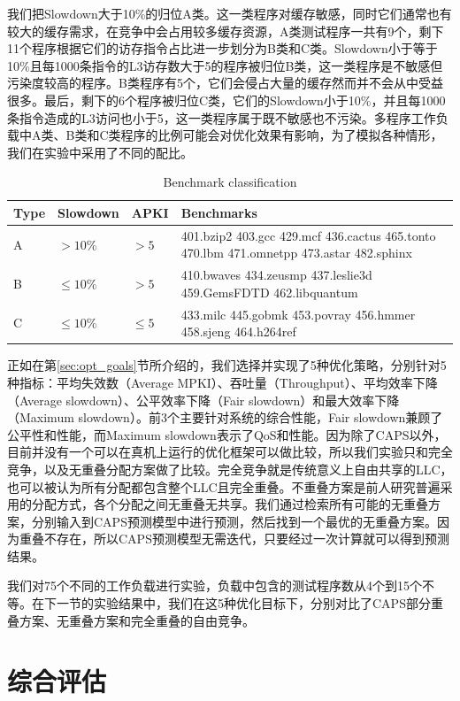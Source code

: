 我们把Slowdown大于10\%的归位A类。这一类程序对缓存敏感，同时它们通常也有较大的缓存需求，在竞争中会占用较多缓存资源，A类测试程序一共有9个，剩下11个程序根据它们的访存指令占比进一步划分为B类和C类。Slowdown小于等于10\%且每1000条指令的L3访存数大于5的程序被归位B类，这一类程序是不敏感但污染度较高的程序。B类程序有5个，它们会侵占大量的缓存然而并不会从中受益很多。最后，剩下的6个程序被归位C类，它们的Slowdown小于10\%，并且每1000条指令造成的L3访问也小于5，这一类程序属于既不敏感也不污染。多程序工作负载中A类、B类和C类程序的比例可能会对优化效果有影响，为了模拟各种情形，我们在实验中采用了不同的配比。

\begin{table}[htbp]
\caption{Benchmark classification}
\label{tab:benchmarks}
\centering
\begin{tabularx} {1\textwidth}{|l|l|l|X| } 
 \hline
 Type & Slowdown & APKI & Benchmarks \\
 \hline
 A & $> 10\%$ & $> 5$ & 401.bzip2 403.gcc 429.mcf 436.cactus 465.tonto 470.lbm 471.omnetpp 473.astar 482.sphinx\\ 
 \hline
 B & $\leq 10\%$ & $> 5$ & 410.bwaves 434.zeusmp 437.leslie3d 459.GemsFDTD 462.libquantum\\ 
 \hline
 C & $\leq 10\%$ & $\leq 5$ & 433.milc 445.gobmk 453.povray 456.hmmer 458.sjeng 464.h264ref\\
 \hline 
\end{tabularx}
\end{table}

正如在第\ref{sec:opt_goals}节所介绍的，我们选择并实现了5种优化策略，分别针对5种指标：平均失效数（Average MPKI）、吞吐量（Throughput）、平均效率下降（Average slowdown）、公平效率下降（Fair slowdown）和最大效率下降（Maximum slowdown）。前3个主要针对系统的综合性能，Fair slowdown兼顾了公平性和性能，而Maximum slowdown表示了QoS和性能。因为除了CAPS以外，目前并没有一个可以在真机上运行的优化框架可以做比较，所以我们实验只和完全竞争，以及无重叠分配方案做了比较。完全竞争就是传统意义上自由共享的LLC，也可以被认为所有分配都包含整个LLC且完全重叠。不重叠方案是前人研究普遍采用的分配方式，各个分配之间无重叠无共享。我们通过检索所有可能的无重叠方案，分别输入到CAPS预测模型中进行预测，然后找到一个最优的无重叠方案。因为重叠不存在，所以CAPS预测模型无需迭代，只要经过一次计算就可以得到预测结果。

我们对75个不同的工作负载进行实验，负载中包含的测试程序数从4个到15个不等。在下一节的实验结果中，我们在这5种优化目标下，分别对比了CAPS部分重叠方案、无重叠方案和完全重叠的自由竞争。

\section{综合评估}

